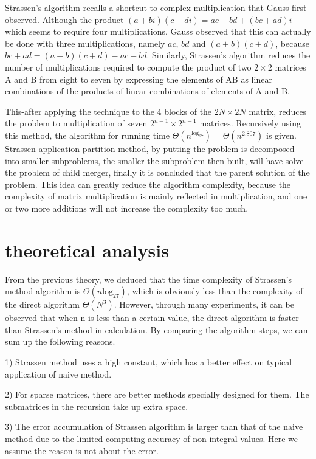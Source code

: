 \documentclass[journal]{IEEEtran}
\begin{document}
Strassen's algorithm recalls a shortcut to complex multiplication that Gauss first observed.
Although the product $(a+ bi)(c+di) =ac-bd+(bc+ad)i$ which seems to require four multiplications, Gauss observed that this can actually be done with three multiplications, namely $ac$, $bd$ and $(a+b)(c+d)$, because $bc+ad=(a+b)(c+d)-ac-bd$.
Similarly, Strassen's algorithm reduces the number of multiplications required to compute the product of two $2\times2$ matrices A and B from eight to seven by expressing the elements of AB as linear combinations of the products of linear combinations of elements of A and B.


This-after applying the technique to the 4 blocks of the $2N\times2N$ matrix, reduces the problem to multiplication of seven $2^{n-1}\times 2^{n-1}$ matrices.
Recursively using this method, the algorithm for running time $\Theta(n^{\mathrm{log}_27})=\Theta(n^{2.807})$ is given.
Strassen application partition method, by putting the problem is decomposed into smaller subproblems, the smaller the subproblem then built, will have solve the problem of child merger, finally it is concluded that the parent solution of the problem.
This idea can greatly reduce the algorithm complexity, because the complexity of matrix multiplication is mainly reflected in multiplication, and one or two more additions will not increase the complexity too much.

\section{theoretical analysis}
From the previous theory, we deduced that the time complexity of Strassen's method algorithm is $\Theta(n\mathrm{log}_27)$, which is obviously less than the complexity of the direct algorithm $\Theta(N^3)$.
However, through many experiments, it can be observed that when n is less than a certain value, the direct algorithm is faster than Strassen's method in calculation.
By comparing the algorithm steps, we can sum up the following reasons.


1) Strassen method uses a high constant, which has a better effect on typical application of naive method.


2) For sparse matrices, there are better methods specially designed for them.
The submatrices in the recursion take up extra space.


3) The error accumulation of Strassen algorithm is larger than that of the naive method due to the limited computing accuracy of non-integral values.
Here we assume the reason is not about the error.
\end{document}
